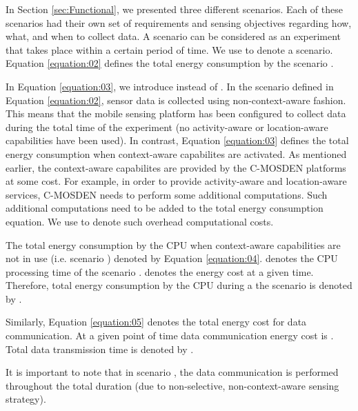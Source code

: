 \documentclass[journal]{IEEEtran}
\begin{document}
In Section \ref{sec:Functional}, we presented three different scenarios. Each of these scenarios had their own set of requirements and sensing objectives regarding how, what, and when to collect data. A scenario can be considered as an experiment that takes place within a certain period of time. We use  to denote a scenario. Equation \ref{equation:02} defines the total energy consumption by the scenario .







In Equation \ref{equation:03}, we introduce  instead of . In the scenario defined in  Equation \ref{equation:02}, sensor data is collected using non-context-aware fashion. This means that the mobile sensing platform has been configured to collect data during the total time of the experiment (no activity-aware or location-aware capabilities have been used). In contrast, Equation \ref{equation:03} defines the total energy consumption when context-aware capabilites are activated. As  mentioned earlier, the context-aware capabilites are provided by the C-MOSDEN platforms at some cost. For example, in order to provide activity-aware and location-aware services, C-MOSDEN needs to perform some additional computations. Such additional computations need to be added to the total energy consumption equation. We use  to denote such overhead computational costs.










The total energy consumption by the CPU when context-aware capabilities are not in use (i.e. scenario ) denoted by Equation \ref{equation:04}.  denotes the CPU processing time of the scenario .  denotes the energy cost at a given time. Therefore, total energy consumption by the CPU during a the scenario  is denoted by .






Similarly, Equation \ref{equation:05}  denotes the total energy cost for data communication. At a given point of time  data communication energy cost is . Total data transmission time is denoted by .











It is important to note that in scenario , the  data communication is performed throughout the total duration (due to non-selective, non-context-aware sensing strategy). 
\end{document}
